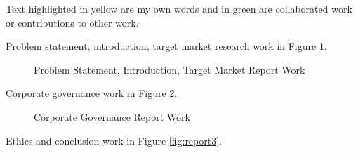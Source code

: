 \documentclass[11pt, a4, nocenter, margin=150mm]{article}
\begin{document}
\begin{appendices}
	Text highlighted in yellow are my own words and in green are collaborated work or contributions to other work.

	Problem statement, introduction, target market research work in Figure \ref{fig:report1}.

	\begin{figure}[h!]
		\centering
		\caption{Problem Statement, Introduction, Target Market Report Work}
		\label{fig:report1}
	\end{figure}

	Corporate governance work in Figure \ref{fig:report2}.

	\begin{figure}[h!]
		\centering
		\caption{Corporate Governance Report Work}
		\label{fig:report2}
	\end{figure}

	Ethics and conclusion work in Figure \ref{fig:report3}.


\end{appendices}
\end{document}
